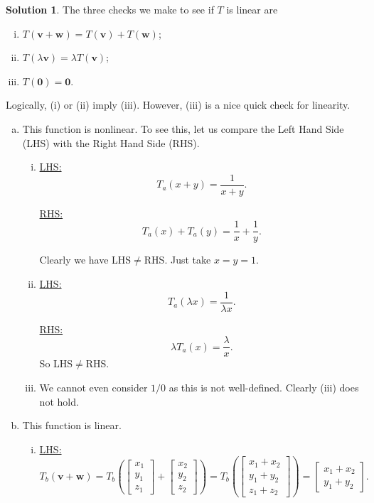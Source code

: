 \documentclass[12pt]{report} %
\theoremstyle{definition}
\newtheorem{solution}{Solution}
\begin{document}
\begin{solution}
The three checks we make to see if $T$ is linear are
\begin{enumerate}[(i)]
    \item $T(\mathbf{v}+\mathbf{w})=T(\mathbf{v})+T(\mathbf{w})$;
    \item $T(\lambda \mathbf{v})=\lambda T(\mathbf{v})$;
    \item $T(\mathbf{0})=\mathbf{0}$.
\end{enumerate}
Logically, (i) or (ii) imply (iii).  However, (iii) is a nice quick check for linearity.
\begin{enumerate}[(a)]
    \item This function is nonlinear.  To see this, let us compare the Left Hand Side (LHS) with the Right Hand Side (RHS).
    
    \begin{enumerate}[(i)]
    \item     \noindent\underline{LHS:}
    \[
    T_a(x+y)=\frac{1}{x+y}.
    \]
    
    \noindent\underline{RHS:}
    \[
    T_a(x)+T_a(y)=\frac{1}{x}+\frac{1}{y}.
    \]
    
    Clearly we have LHS$\neq$RHS.  Just take $x=y=1$.
    
    \item     \noindent\underline{LHS:}
    \[
    T_a(\lambda x)=\frac{1}{\lambda x}.
    \]
    
    \noindent\underline{RHS:}
    \[
    \lambda T_a(x)=\frac{\lambda}{x}.
    \]
    So LHS$\neq$RHS.
    
    \item We cannot even consider $1/0$ as this is not well-defined.  Clearly (iii) does not hold.
    \end{enumerate}
    
    \item This function is linear. 

    \begin{enumerate}[(i)]
    \item     \noindent\underline{LHS:}
    \[
    T_b(\mathbf{v}+\mathbf{w})=T_b\left( \begin{bmatrix} x_1\\y_1\\z_1\end{bmatrix} + \begin{bmatrix} x_2\\y_2\\z_2\end{bmatrix}\right)=T_b\left( \begin{bmatrix} x_1+x_2\\y_1+y_2\\z_1+z_2\end{bmatrix}\right)=\begin{bmatrix} x_1+x_2\\y_1+y_2\end{bmatrix}.
    \]
    

\end{enumerate}
\end{enumerate}
\end{solution}
\end{document}

